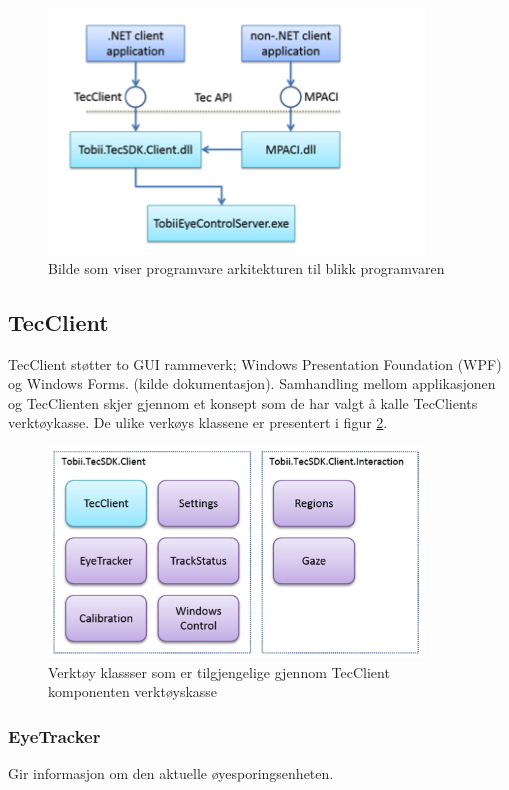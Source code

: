 \documentclass[phd,tocprelim]{cornell}
\begin{document}
\begin{figure}[ht!]
\centering
\includegraphics[width=100mm]{SoftwareArchitectureOverview}
\caption{Bilde som viser programvare arkitekturen til blikk programvaren}
\label{fig:overview}
\end{figure}


\subsection{TecClient}

TecClient støtter to GUI rammeverk; Windows Presentation Foundation (\gls{WPF}) og Windows Forms. 
\cite{Dokumentasjonen} (kilde dokumentasjon).  Samhandling mellom applikasjonen og TecClienten skjer gjennom et konsept som de har valgt å kalle TecClients verktøykasse. De ulike verkøys klassene er presentert i figur \ref{fig:toolbox}. 

\begin{figure}[ht!]
\centering
\includegraphics[width=100mm]{Toolbox}
\caption{Verktøy klassser som er tilgjengelige gjennom TecClient komponenten verktøyskasse}
\label{fig:toolbox}
\end{figure}


\subsubsection{EyeTracker}
Gir informasjon om den aktuelle øyesporingsenheten.
\end{document}
